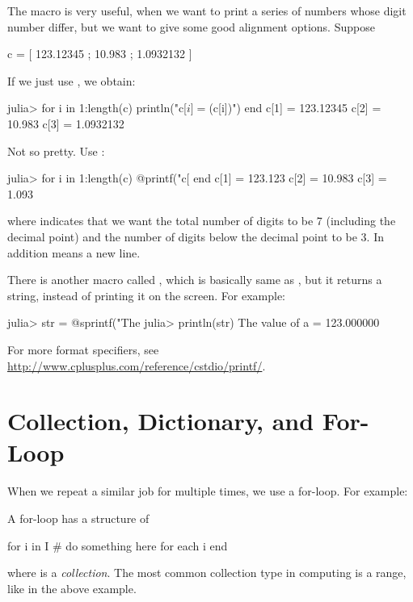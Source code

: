The  macro is very useful, when we want to print a series of numbers whose digit number differ, but we want to give some good alignment options. Suppose
\begin{code}
c = [ 123.12345   ;
       10.983     ;
        1.0932132  ]
\end{code}
\noindent If we just use , we obtain:
\begin{code}
julia> for i in 1:length(c)
           println("c[$i] = $(c[i])")
       end
c[1] = 123.12345
c[2] = 10.983
c[3] = 1.0932132
\end{code}
\noindent Not so pretty. Use :
\begin{code}
julia> for i in 1:length(c)
           @printf("c[%
       end
c[1] = 123.123
c[2] =  10.983
c[3] =   1.093
\end{code}
\noindent where  indicates that we want the total number of digits to be 7 (including the decimal point) and the number of digits below the decimal point to be 3. In addition  means a new line.

There is another macro called , which is basically same as , but it returns a string, instead of printing it on the screen. For example:
\begin{code}
julia> str = @sprintf("The %
julia> println(str)
The value of a = 123.000000
\end{code}

For more format specifiers, see \url{http://www.cplusplus.com/reference/cstdio/printf/}.






\section{Collection, Dictionary, and For-Loop}

When we repeat a similar job for multiple times, we use a for-loop. For example:
A for-loop has a structure of
\begin{code}
for i in I
	# do something here for each i
end
\end{code}
\noindent where  is a \emph{collection}. The most common collection type in computing is a range, like  in the above example.

